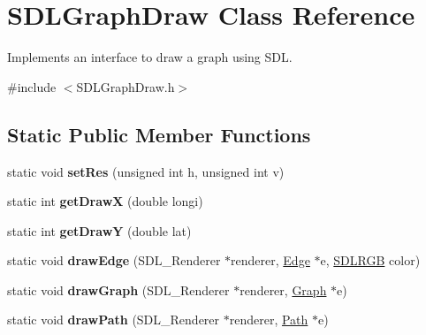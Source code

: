 \hypertarget{class_s_d_l_graph_draw}{}\section{S\+D\+L\+Graph\+Draw Class Reference}
\label{class_s_d_l_graph_draw}


Implements an interface to draw a graph using S\+D\+L.  




{\ttfamily \#include $<$S\+D\+L\+Graph\+Draw.\+h$>$}

\subsection*{Static Public Member Functions}
\begin{DoxyCompactItemize}
\item 
\hypertarget{class_s_d_l_graph_draw_ae56dbc9d582adecd6fd98fd8808885aa}{}static void {\bfseries set\+Res} (unsigned int h, unsigned int v)\label{class_s_d_l_graph_draw_ae56dbc9d582adecd6fd98fd8808885aa}

\item 
\hypertarget{class_s_d_l_graph_draw_a6a0b3dcf2f40921433bc75f607367490}{}static int {\bfseries get\+Draw\+X} (double longi)\label{class_s_d_l_graph_draw_a6a0b3dcf2f40921433bc75f607367490}

\item 
\hypertarget{class_s_d_l_graph_draw_ab9ea987f3e278b871cda4dd52c2ea895}{}static int {\bfseries get\+Draw\+Y} (double lat)\label{class_s_d_l_graph_draw_ab9ea987f3e278b871cda4dd52c2ea895}

\item 
\hypertarget{class_s_d_l_graph_draw_afafb91d2683ba268d0996d7083b655db}{}static void {\bfseries draw\+Edge} (S\+D\+L\+\_\+\+Renderer $\ast$renderer, \hyperlink{class_edge}{Edge} $\ast$e, \hyperlink{class_s_d_l_r_g_b}{S\+D\+L\+R\+G\+B} color)\label{class_s_d_l_graph_draw_afafb91d2683ba268d0996d7083b655db}

\item 
\hypertarget{class_s_d_l_graph_draw_a25159ed823e3ad2630453d6c13b51f33}{}static void {\bfseries draw\+Graph} (S\+D\+L\+\_\+\+Renderer $\ast$renderer, \hyperlink{class_graph}{Graph} $\ast$e)\label{class_s_d_l_graph_draw_a25159ed823e3ad2630453d6c13b51f33}

\item 
\hypertarget{class_s_d_l_graph_draw_af84f868a9558733840d64d82751bdd85}{}static void {\bfseries draw\+Path} (S\+D\+L\+\_\+\+Renderer $\ast$renderer, \hyperlink{class_path}{Path} $\ast$e)\label{class_s_d_l_graph_draw_af84f868a9558733840d64d82751bdd85}


\end{DoxyCompactItemize}
